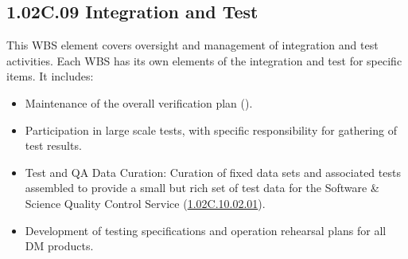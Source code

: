 \subsection*{1.02C.09 Integration and Test}

This WBS element covers oversight and management of integration and test activities. Each WBS has its own elements of the integration and test for specific items. It includes:

\begin{itemize}

\item{Maintenance of the overall verification plan ().}

\item{Participation in large scale tests, with specific responsibility for
gathering of test results.}

\item{Test and QA Data Curation: Curation of fixed data sets and associated
tests assembled to provide a small but rich set of test data for the Software
\& Science Quality Control Service
(\hyperref[wbs:1.02C.10.02.01]{1.02C.10.02.01}).}

\item{Development of testing specifications and operation rehearsal plans for
all DM products.}

\end{itemize}


